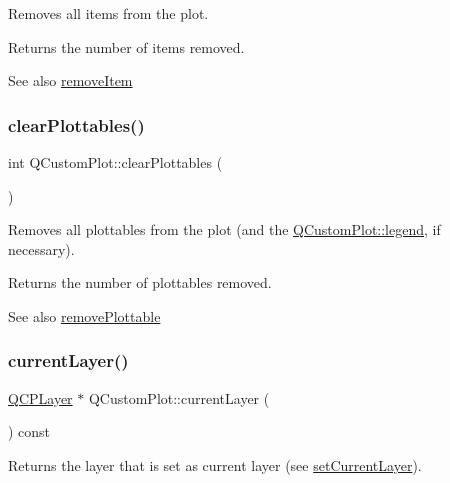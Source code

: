 Removes all items from the plot.

Returns the number of items removed.

\begin{DoxySeeAlso}{See also}
\hyperlink{class_q_custom_plot_ae04446557292551e8fb6e2c106e1848d}{remove\+Item} 
\end{DoxySeeAlso}
\hypertarget{class_q_custom_plot_a9a409bb3201878adb7ffba1c89c4e004}{}\label{class_q_custom_plot_a9a409bb3201878adb7ffba1c89c4e004} 
\subsubsection{\texorpdfstring{clear\+Plottables()}{clearPlottables()}}
{\footnotesize\ttfamily int Q\+Custom\+Plot\+::clear\+Plottables (\begin{DoxyParamCaption}{ }\end{DoxyParamCaption})}

Removes all plottables from the plot (and the \hyperlink{class_q_custom_plot_a4eadcd237dc6a09938b68b16877fa6af}{Q\+Custom\+Plot\+::legend}, if necessary).

Returns the number of plottables removed.

\begin{DoxySeeAlso}{See also}
\hyperlink{class_q_custom_plot_af3dafd56884208474f311d6226513ab2}{remove\+Plottable} 
\end{DoxySeeAlso}
\hypertarget{class_q_custom_plot_a0421d647f420b0b4c57aec1708857af5}{}\label{class_q_custom_plot_a0421d647f420b0b4c57aec1708857af5} 
\subsubsection{\texorpdfstring{current\+Layer()}{currentLayer()}}
{\footnotesize\ttfamily \hyperlink{class_q_c_p_layer}{Q\+C\+P\+Layer} $\ast$ Q\+Custom\+Plot\+::current\+Layer (\begin{DoxyParamCaption}{ }\end{DoxyParamCaption}) const}

Returns the layer that is set as current layer (see \hyperlink{class_q_custom_plot_a73a6dc47c653bb6f8f030abca5a11852}{set\+Current\+Layer}). \hypertarget{class_q_custom_plot_a9d4808ab925b003054085246c92a257c}{}\label{class_q_custom_plot_a9d4808ab925b003054085246c92a257c} 
